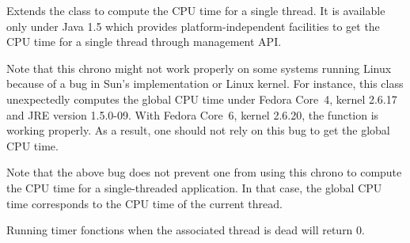 
Extends the  
class to compute the CPU time for a single thread. It is available
only under Java 1.5 which provides platform-independent 
facilities to get the CPU time for a single thread through management API.

Note that this chrono might not work properly on some systems running Linux because
of a bug in Sun's implementation or Linux kernel.
For instance, this class unexpectedly computes the global CPU time
under Fedora 
Core~4, kernel 2.6.17 and JRE version 1.5.0-09.
With Fedora Core~6, kernel 2.6.20, the function is working properly.
As a result, one should not rely on this bug to get the global CPU time.

Note that the above bug does not prevent one from using this chrono to
compute the CPU time for a single-threaded application.  In that case,
the global CPU time corresponds to the CPU time of the current thread.

Running timer fonctions when the associated thread is dead will return 0.

